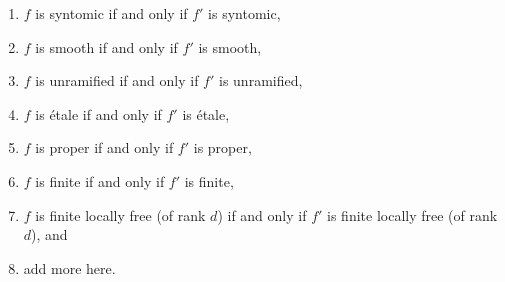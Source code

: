 \begin{lemma}
\begin{enumerate}
\label{item-universally-open-fp-over-ft}
\item $f$ is syntomic if and only if $f'$ is syntomic,
\label{item-syntomic-fp-over-ft}
\item $f$ is smooth if and only if $f'$ is smooth,
\label{item-smooth-fp-over-ft}
\item $f$ is unramified if and only if $f'$ is unramified,
\label{item-unramified-fp-over-ft}
\item $f$ is \'etale if and only if $f'$ is \'etale,
\label{item-etale-fp-over-ft}
\item $f$ is proper if and only if $f'$ is proper,
\label{item-proper-fp-over-ft}
\item $f$ is finite if and only if $f'$ is finite,
\label{item-finite-fp-over-ft}
\item
\label{item-finite-locally-free-fp-over-ft}
$f$ is finite locally free (of rank $d$) if and only if $f'$
is finite locally free (of rank $d$), and
\item add more here.
\end{enumerate}
\end{lemma}

